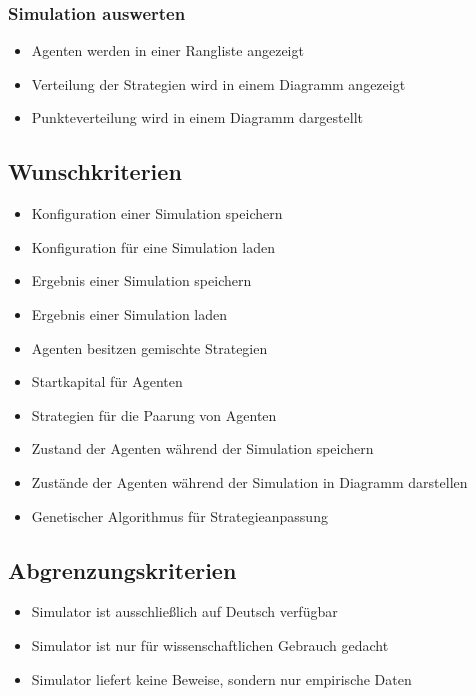 \subsubsection{Simulation auswerten}
\begin{itemize}
\item Agenten werden in einer Rangliste angezeigt
\item Verteilung der Strategien wird in einem Diagramm angezeigt
\item Punkteverteilung wird in einem Diagramm dargestellt
\end{itemize}

%

\subsection{Wunschkriterien}
\begin{itemize}
\item Konfiguration einer Simulation speichern
\item Konfiguration für eine Simulation laden
\item Ergebnis einer Simulation speichern
\item Ergebnis einer Simulation laden
\item Agenten besitzen gemischte Strategien
\item Startkapital für Agenten
\item Strategien für die Paarung von Agenten
\item Zustand der Agenten während der Simulation speichern
\item Zustände der Agenten während der Simulation in Diagramm darstellen
\item Genetischer Algorithmus für Strategieanpassung
\end{itemize}

\subsection{Abgrenzungskriterien}
\begin{itemize}
\item Simulator ist ausschließlich auf Deutsch verfügbar
\item Simulator ist nur für wissenschaftlichen Gebrauch gedacht
\item Simulator liefert keine Beweise, sondern nur empirische Daten
\end{itemize}